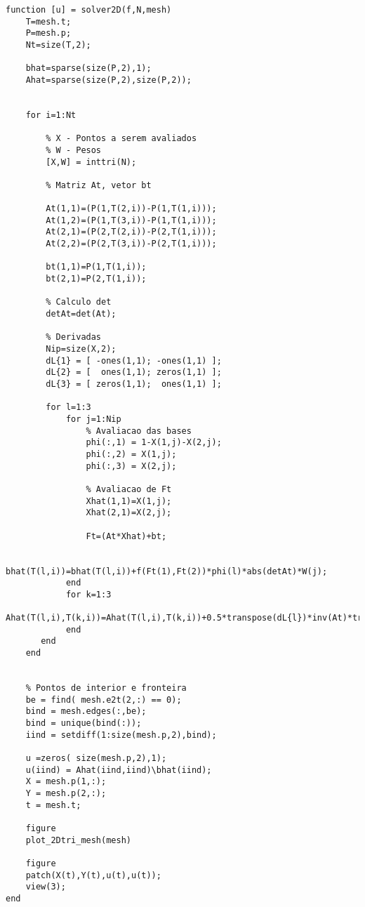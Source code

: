 \documentclass{article}
\theoremstyle{definition}
\theoremstyle{plain}
\numberwithin{equation}{section}
\begin{document}
\vspace{5mm}
\begin{lstlisting}[frame=single]
function [u] = solver2D(f,N,mesh)
    T=mesh.t;
    P=mesh.p;
    Nt=size(T,2);
    
    bhat=sparse(size(P,2),1);
    Ahat=sparse(size(P,2),size(P,2));
    
    
    for i=1:Nt
        
        % X - Pontos a serem avaliados
        % W - Pesos
        [X,W] = inttri(N);
    
        % Matriz At, vetor bt
    
        At(1,1)=(P(1,T(2,i))-P(1,T(1,i)));
        At(1,2)=(P(1,T(3,i))-P(1,T(1,i)));
        At(2,1)=(P(2,T(2,i))-P(2,T(1,i)));
        At(2,2)=(P(2,T(3,i))-P(2,T(1,i)));
    
        bt(1,1)=P(1,T(1,i));
        bt(2,1)=P(2,T(1,i));
    
        % Calculo det
        detAt=det(At);
    
        % Derivadas
        Nip=size(X,2);
        dL{1} = [ -ones(1,1); -ones(1,1) ];
        dL{2} = [  ones(1,1); zeros(1,1) ];
        dL{3} = [ zeros(1,1);  ones(1,1) ];
    
        for l=1:3
            for j=1:Nip
                % Avaliacao das bases
                phi(:,1) = 1-X(1,j)-X(2,j);
                phi(:,2) = X(1,j);
                phi(:,3) = X(2,j);
                
                % Avaliacao de Ft 
                Xhat(1,1)=X(1,j);
                Xhat(2,1)=X(2,j);
        
                Ft=(At*Xhat)+bt;
    
                bhat(T(l,i))=bhat(T(l,i))+f(Ft(1),Ft(2))*phi(l)*abs(detAt)*W(j);
            end
            for k=1:3
                Ahat(T(l,i),T(k,i))=Ahat(T(l,i),T(k,i))+0.5*transpose(dL{l})*inv(At)*transpose(inv(At))*dL{k}*abs(detAt);
            end
       end
    end

    
    % Pontos de interior e fronteira
    be = find( mesh.e2t(2,:) == 0);
    bind = mesh.edges(:,be);
    bind = unique(bind(:));
    iind = setdiff(1:size(mesh.p,2),bind);

    u =zeros( size(mesh.p,2),1);
    u(iind) = Ahat(iind,iind)\bhat(iind);
    X = mesh.p(1,:);
    Y = mesh.p(2,:);
    t = mesh.t;
    
    figure
    plot_2Dtri_mesh(mesh)
    
    figure
    patch(X(t),Y(t),u(t),u(t));
    view(3);
end
\end{lstlisting}
\vspace{5mm}
\end{document}
